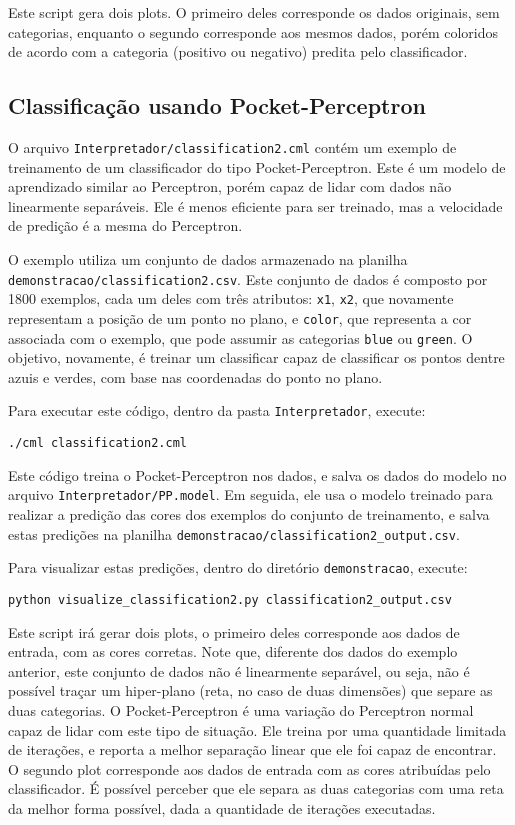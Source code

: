 \documentclass[12pt]{article}
\begin{document}
Este script gera dois plots. O primeiro deles corresponde os dados originais, sem categorias, enquanto o segundo corresponde aos mesmos dados, porém coloridos de acordo com a categoria (positivo ou negativo) predita pelo classificador.

\subsection{Classificação usando Pocket-Perceptron}

O arquivo \texttt{Interpretador/classification2.cml} contém um exemplo de treinamento de um classificador do tipo Pocket-Perceptron. Este é um modelo de aprendizado similar ao Perceptron, porém capaz de lidar com dados não linearmente separáveis. Ele é menos eficiente para ser treinado, mas a velocidade de predição é a mesma do Perceptron.

O exemplo utiliza um conjunto de dados armazenado na planilha \texttt{demonstracao/classification2.csv}. Este conjunto de dados é composto por 1800 exemplos, cada um deles com três atributos: \texttt{x1}, \texttt{x2}, que novamente representam a posição de um ponto no plano, e \texttt{color}, que representa a cor associada com o exemplo, que pode assumir as categorias \texttt{blue} ou \texttt{green}. O objetivo, novamente, é treinar um classificar capaz de classificar os pontos dentre azuis e verdes, com base nas coordenadas do ponto no plano. 

Para executar este código, dentro da pasta \texttt{Interpretador}, execute:

\begin{verbatim}
./cml classification2.cml
\end{verbatim}

Este código treina o Pocket-Perceptron nos dados, e salva os dados do modelo no arquivo \texttt{Interpretador/PP.model}. Em seguida, ele usa o modelo treinado para realizar a predição das cores dos exemplos do conjunto de treinamento, e salva estas predições na planilha \texttt{demonstracao/classification2\_output.csv}.

Para visualizar estas predições, dentro do diretório \texttt{demonstracao}, execute:

\begin{verbatim}
python visualize_classification2.py classification2_output.csv
\end{verbatim}

Este script irá gerar dois plots, o primeiro deles corresponde aos dados de entrada, com as cores corretas. Note que, diferente dos dados do exemplo anterior, este conjunto de dados não é linearmente separável, ou seja, não é possível traçar um hiper-plano (reta, no caso de duas dimensões) que separe as duas categorias. O Pocket-Perceptron é uma variação do Perceptron normal capaz de lidar com este tipo de situação. Ele treina por uma quantidade limitada de iterações, e reporta a melhor separação linear que ele foi capaz de encontrar. O segundo plot corresponde aos dados de entrada com as cores atribuídas pelo classificador. É possível perceber que ele separa as duas categorias com uma reta da melhor forma possível, dada a quantidade de iterações executadas.
\end{document}
